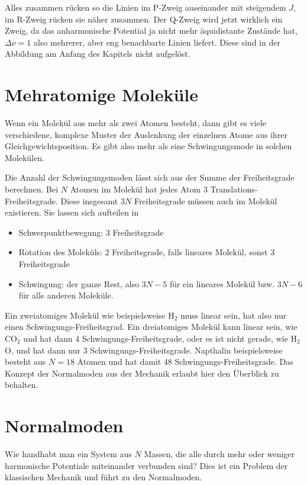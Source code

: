 Alles zusammen rücken so die Linien im P-Zweig auseinander mit steigendem $J$, im R-Zweig rücken sie näher zusammen. Der Q-Zweig wird jetzt wirklich ein Zweig, da das anharmonische Potential ja nicht mehr äquidistante Zustände hat, $\Delta \nu = 1$ also mehrerer, aber eng benachbarte Linien liefert. Diese sind in der Abbildung am Anfang des Kapitels nicht aufgelöst.


\section{Mehratomige Moleküle}

Wenn ein Molekül aus mehr als zwei Atomen besteht, dann gibt es viele verschiedene, komplexe Muster der Auslenkung der einzelnen Atome aus ihrer Gleichgewichtsposition. Es gibt also mehr als eine Schwingungsmode in solchen Molekülen.

Die Anzahl der Schwingungsmoden lässt sich aus der Summe der Freiheitsgrade berechnen. Bei $N$ Atomen im Molekül hat jedes Atom $3$ Translations-Freiheitsgrade. Diese insgesamt $3N$ Freiheitsgrade müssen auch im Molekül existieren. Sie lassen sich aufteilen in
\begin{itemize} \setlength{\itemsep}{0pt}
\item Schwerpunktbewegung: 3 Freiheitsgrade
\item Rotation des Moleküls: 2 Freiheitsgrade, falls lineares Molekül, sonst 3 Freiheitsgrade
\item Schwingung: der ganze Rest, also $3N-5$ für ein lineares Molekül bzw. $3N-6$ für alle anderen Moleküle. 
\end{itemize}

Ein zweiatomiges Molekül wie beispielsweise H$_2$ muss linear sein, hat also nur einen Schwingungs-Freiheitsgrad. Ein dreiatomiges Molekül kann linear sein, wie CO$_2$ und hat dann 4  Schwingungs-Freiheitsgrade, oder es ist nicht gerade, wie H$_2$O, und hat dann nur 3  Schwingungs-Freiheitsgrade. Napthalin beispielsweise besteht aus $N=18$ Atomen und hat damit  48 Schwingungs-Freiheitsgrade. Das Konzept der Normalmoden aus der Mechanik erlaubt hier den Überblick zu behalten.


\section{Normalmoden}

Wie handhabt man ein System aus $N$ Massen, die alle durch mehr oder weniger harmonische Potentiale miteinander verbunden sind? Dies ist ein Problem der klassischen Mechanik und führt zu den Normalmoden.

